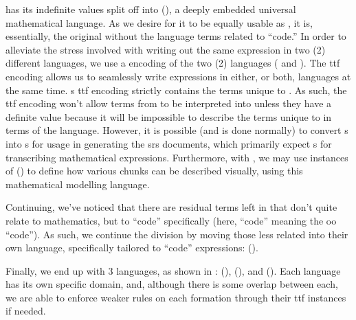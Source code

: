 \Expr{} has its indefinite values split off into \ModelExpr{}
(), a deeply embedded universal mathematical
language. As we desire for it to be equally usable as \Expr{}, it is,
essentially, the original \Expr{} without the language terms related to
``code.'' In order to alleviate the stress involved with
writing out the same expression in two (2) different languages, we use a
 encoding of the two (2) languages ( and
). The \acs{ttf} encoding allows us to
seamlessly write expressions in either, or both, languages at the same time.
\ModelExpr{}s \acs{ttf} encoding strictly contains the terms unique to
\ModelExpr{}. As such, the \acs{ttf} encoding won't allow terms from
\ModelExpr{} to be interpreted into \Expr{} unless they have a definite value
because it will be impossible to describe the terms unique to \ModelExpr{} in
terms of the \Expr{} language. However, it is possible (and is done normally) to
convert \Expr{}s into \ModelExpr{}s for usage in generating the \acs{srs}
documents, which primarily expect \ModelExpr{}s for transcribing mathematical
expressions. Furthermore, with \ModelExpr{}, we may use instances of \Express{}
() to define how various chunks can be described
visually, using this mathematical modelling language.

\currentExpressHaskell{}

Continuing, we've noticed that there are residual terms left in \Expr{} that
don't quite relate to mathematics, but to ``code'' specifically (here, ``code''
meaning the \acs{oo} ``code''). As such, we continue the division by moving
those less related into their own language, specifically tailored to ``code''
expressions: \CodeExpr{} ().

Finally, we end up with 3 languages, as shown in : \Expr{}
(), \ModelExpr{} (), and
\CodeExpr{} (). Each language has its own
specific domain, and, although there is some overlap between each, we are able
to enforce weaker rules on each formation through their \acs{ttf} instances if
needed.

